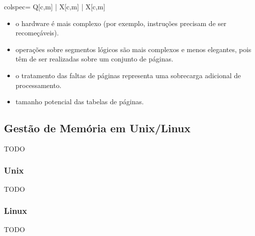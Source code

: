 \documentclass[11pt]{article}
\begin{document}
\begin{tblr}{colspec={ Q[c,m] | X[c,m] | X[c,m] }}
\begin{minipage}{.4\textwidth}
        \begin{itemize}[leftmargin=8pt]
            \item o hardware é mais complexo (por exemplo, instruções precisam de ser recomeçáveis).
            \item operações sobre segmentos lógicos são mais complexos e menos elegantes, pois têm de ser realizadas sobre um conjunto de páginas.
            \item o tratamento das faltas de páginas representa uma sobrecarga adicional de processamento.
            \item tamanho potencial das tabelas de páginas.
        \end{itemize}
    \end{minipage}
\end{tblr}

\subsection{Gestão de Memória em Unix/Linux}

TODO

\subsubsection{Unix}

TODO

\subsubsection{Linux}

TODO
\end{document}
